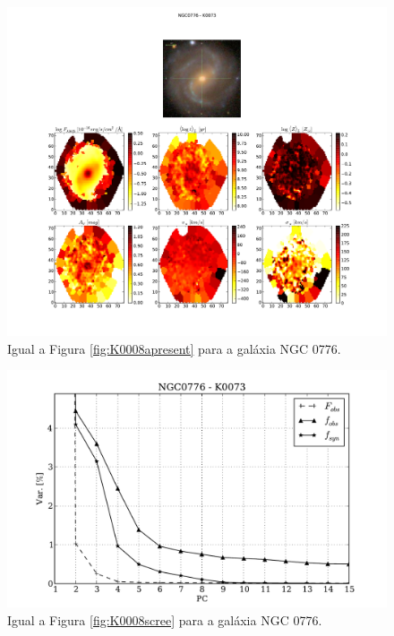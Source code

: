 \begin{figure}
    \includegraphics[width=1.\textwidth]{figuras/K0073-apresent.pdf}
    \caption[Propriedades f\'isicas da gal\'axia NGC 0776.]
    {Igual a Figura \ref{fig:K0008apresent} para a galáxia NGC 0776.}
    \label{fig:K0073apresent}
\end{figure}

\begin{figure}
    \includegraphics[height=0.33\textheight]{figuras/K0073-screetest.pdf}
    \caption[Scree test comparativo entre 3 PCAs - NGC 0776.]
    {Igual a Figura \ref{fig:K0008scree} para a galáxia NGC 0776.}
    \label{fig:K0073scree}
\end{figure}

